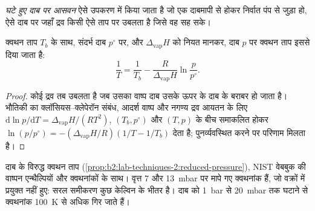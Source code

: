 \begin{definition}[घटे हुए दाब पर आसवन]\label{def:b2:lab-techniques-2:reduced-pressure}
\emph{घटे हुए दाब पर आसवन} ऐसे उपकरण में किया जाता है
जो एक दाबमापी से होकर निर्वात पंप से जुड़ा हो, ऐसे दाब पर जहाँ द्रव
किसी ऐसे ताप पर उबलता है जिसे वह सह सके।
\end{definition}

\begin{proposition}[घटे हुए दाब पर क्वथन]\label{prop:b2:lab-techniques-2:reduced-pressure}
क्वथन ताप $T_b$ के साथ, संदर्भ दाब $p^\circ$ पर, और $\Delta_{\mathrm{vap}}H$ को
नियत मानकर, दाब $p$ पर क्वथन ताप इससे दिया जाता है:
\begin{equation*}
\frac{1}{T} = \frac{1}{T_b} - \frac{R}{\Delta_{\mathrm{vap}}H}\ln\frac{p}{p^\circ}.
\end{equation*}
\end{proposition}

\begin{proof}
कोई द्रव तब उबलता है जब उसका वाष्प दाब उसके ऊपर के दाब के बराबर हो जाता है। भौतिकी का क्लॉसियस--क्लेपेरॉन संबंध,
आदर्श वाष्प और नगण्य द्रव आयतन के लिए $\mathrm d\ln p/\mathrm dT = \Delta_{\mathrm{vap}}H/(RT^2)$,
$(T_b, p^\circ)$ और $(T, p)$ के बीच समाकलित होकर $\ln(p/p^\circ) =
-(\Delta_{\mathrm{vap}}H/R)(1/T - 1/T_b)$ देता है; पुनर्व्यवस्थित करने पर परिणाम मिलता है।
\end{proof}

\begin{omfigure}

{\small दाब के विरुद्ध क्वथन ताप (\cref{prop:b2:lab-techniques-2:reduced-pressure}),
NIST वेबबुक की वाष्पन एन्थैल्पियों और क्वथनांकों के साथ। वृत्त 7 और \qty{13}{mbar} पर मापे गए क्वथनांक
हैं, जो वक्रों में प्रयुक्त नहीं हुए: सरल समीकरण कुछ केल्विन के भीतर है।
दाब को \qty{1}{bar} से \qty{20}{mbar} तक घटाने से क्वथनांक
\qty{100}{K} से अधिक गिर जाते हैं।}
\end{omfigure}

